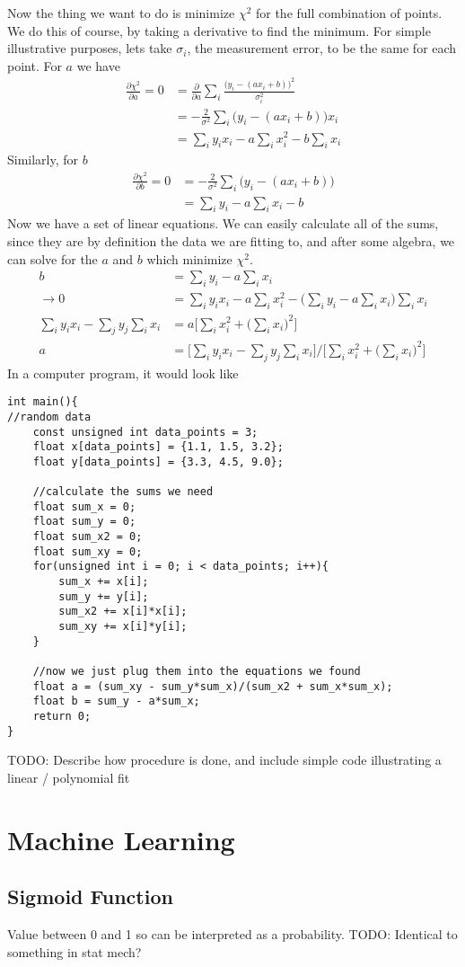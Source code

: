 Now the thing we want to do is minimize $\chi^2$ for the full combination of points. We do this of course, by taking a derivative to find the minimum. For simple illustrative purposes, lets take $\sigma_i$, the measurement error, to be the same for each point. For $a$ we have
\begin{align}
\frac{\partial \chi^2}{\partial a} = 0 &= \frac{\partial}{\partial a} \sum_i \frac{\Big(y_i - (ax_i + b)\Big)^2}{\sigma_i^2} \\
&= - \frac{2}{\sigma^2}\sum_i \Big(y_i - (ax_i+b)\Big)x_i\\
&= \sum_i y_i x_i - a\sum_ix_i^2 - b\sum_i x_i
\end{align}
Similarly, for $b$
\begin{align}
\frac{\partial \chi^2}{\partial b} = 0 &= -\frac{2}{\sigma^2}\sum_i \Big(y_i-(ax_i+b)\Big)\\
&= \sum_i y_i - a \sum_i x_i - b
\end{align}
Now we have a set of linear equations. We can easily calculate all of the sums, since they are by definition the data we are fitting to, and after some algebra, we can solve for the $a$ and $b$ which minimize $\chi^2$.
\begin{align}
b &= \sum_i y_i - a \sum_i x_i\\
\rightarrow 0 &= \sum_i y_i x_i - a\sum_ix_i^2 - \Big(\sum_i y_i - a \sum_i x_i\Big)\sum_i x_i\\
\sum_i y_i x_i  - \sum_j y_j \sum_i x_i &= a\Big[\sum_i x_i^2 +\Big(\sum_i x_i\Big)^2\Big]\\
a &= \Big[\sum_i y_i x_i  - \sum_j y_j \sum_i x_i\Big] /\Big[\sum_i x_i^2 +\Big(\sum_i x_i\Big)^2\Big] 
\end{align}
In a computer program, it would look like
\begin{verbatim}
int main(){
//random data
	const unsigned int data_points = 3;
	float x[data_points] = {1.1, 1.5, 3.2};
	float y[data_points] = {3.3, 4.5, 9.0};
	
	//calculate the sums we need
	float sum_x = 0;
	float sum_y = 0;
	float sum_x2 = 0;
	float sum_xy = 0;
	for(unsigned int i = 0; i < data_points; i++){
		sum_x += x[i];
		sum_y += y[i];
		sum_x2 += x[i]*x[i];
		sum_xy += x[i]*y[i];
	}
	
	//now we just plug them into the equations we found
	float a = (sum_xy - sum_y*sum_x)/(sum_x2 + sum_x*sum_x);
	float b = sum_y - a*sum_x;
	return 0;
}
\end{verbatim}

TODO: Describe how procedure is done, and include simple code illustrating a linear / polynomial fit

\section{Machine Learning}

\subsection{Sigmoid Function}
Value between 0 and 1 so can be interpreted as a probability. TODO: Identical to something in stat mech?


